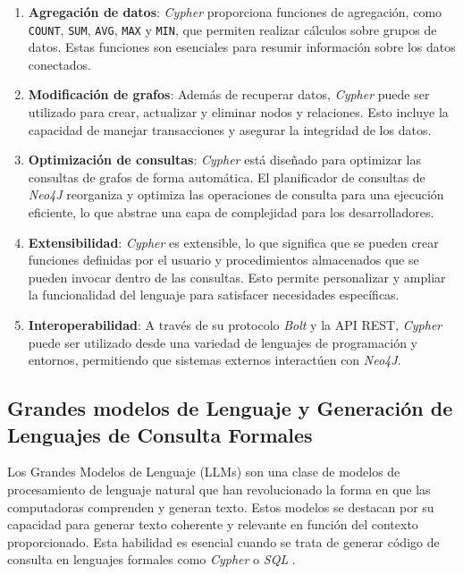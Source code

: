 \begin{enumerate}
\item \textbf{Agregación de datos}: \textit{Cypher} proporciona funciones de agregación, como \texttt{COUNT}, \texttt{SUM}, \texttt{AVG}, \texttt{MAX} y \texttt{MIN}, que permiten realizar cálculos sobre grupos de datos. Estas funciones son esenciales para resumir información sobre los datos conectados.

\item \textbf{Modificación de grafos}: Además de recuperar datos, \textit{Cypher} puede ser utilizado para crear, actualizar y eliminar nodos y relaciones. Esto incluye la capacidad de manejar transacciones y asegurar la integridad de los datos.

\item \textbf{Optimización de consultas}: \textit{Cypher} está diseñado para optimizar las consultas de grafos de forma automática. El planificador de consultas de \textit{Neo4J} reorganiza y optimiza las operaciones de consulta para una ejecución eficiente, lo que abstrae una capa de complejidad para los desarrolladores.

\item \textbf{Extensibilidad}: \textit{Cypher} es extensible, lo que significa que se pueden crear funciones definidas por el usuario y procedimientos almacenados que se pueden invocar dentro de las consultas. Esto permite personalizar y ampliar la funcionalidad del lenguaje para satisfacer necesidades específicas.

\item \textbf{Interoperabilidad}: A través de su protocolo \textit{Bolt} y la API REST, \textit{Cypher} puede ser utilizado desde una variedad de lenguajes de programación y entornos, permitiendo que sistemas externos interactúen con \textit{Neo4J}.

\end{enumerate}

\subsection{Grandes modelos de Lenguaje y Generación de Lenguajes de Consulta Formales} \label{llms_prelude}

Los Grandes Modelos de Lenguaje (LLMs) son una clase de modelos de procesamiento de lenguaje natural que han revolucionado la forma en que las computadoras comprenden y generan texto. Estos modelos se destacan por su capacidad para generar texto coherente y relevante en función del contexto proporcionado. Esta habilidad es esencial cuando se trata de generar código de consulta en lenguajes formales como \textit{Cypher} o \textit{SQL} \cite{llmsoverview}.

